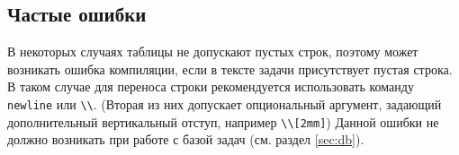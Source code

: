 \setcounter{notask}{1}

\subsection{Частые ошибки}

В некоторых случаях таблицы не допускают пустых строк, поэтому может возникать ошибка компиляции, если в
тексте задачи присутствует пустая строка. В таком случае для переноса строки рекомендуется использовать
команду \texttt{newline} или \texttt{\textbackslash\textbackslash}. (Вторая из
них допускает опциональный аргумент, задающий дополнительный вертикальный
отступ, например \texttt{\textbackslash\textbackslash[2mm]}) Данной ошибки не должно возникать при
работе с базой задач (см. раздел \ref{sec:db}).
